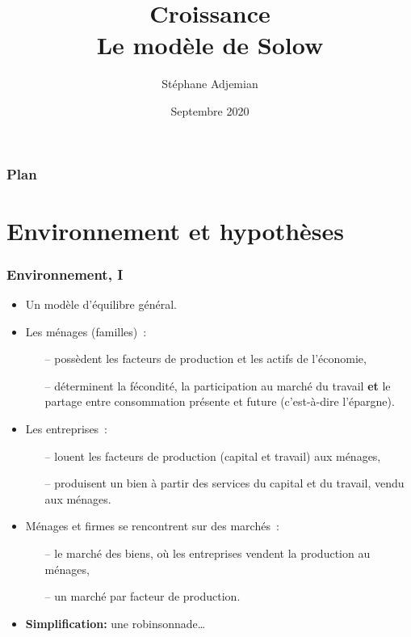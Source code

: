 \documentclass[10pt,notheorems]{beamer}
\theoremstyle{plain}
\theoremstyle{definition} %
\begin{document}
\title{Croissance\\\small{Le modèle de Solow}}
\author[S. Adjemian]{St\'ephane Adjemian}
\date{Septembre 2020}

\begin{frame}
  \titlepage{}
\end{frame}

\begin{frame}
  \frametitle{Plan}
  \tableofcontents
\end{frame}


\section{Environnement et hypothèses}

\begin{frame}
  \frametitle{Environnement, I}

  \begin{itemize}
  \item Un modèle d'équilibre général.
    \medskip
  \item Les ménages (familles)~:
    \begin{itemize}
    \item[--] possèdent les facteurs de production et les actifs de l'économie,
    \item[--] déterminent la fécondité, la participation au marché du travail \textbf{et} le partage entre consommation présente et future (c'est-à-dire l'épargne).
    \end{itemize}
    \medskip
  \item Les entreprises~:
    \begin{itemize}
    \item[--] louent les facteurs de production (capital et travail) aux ménages,
    \item[--] produisent un bien à partir des services du capital et du travail, vendu aux ménages.
    \end{itemize}
    \medskip
  \item Ménages et firmes se rencontrent sur des marchés~:
    \begin{itemize}
    \item[--] le marché des biens, où les entreprises vendent la production au ménages,
    \item[--] un marché par facteur de production.
    \end{itemize}
    \medskip
  \item \textbf{Simplification:} une robinsonnade\ldots
  \end{itemize}

\end{frame}
\end{document}
